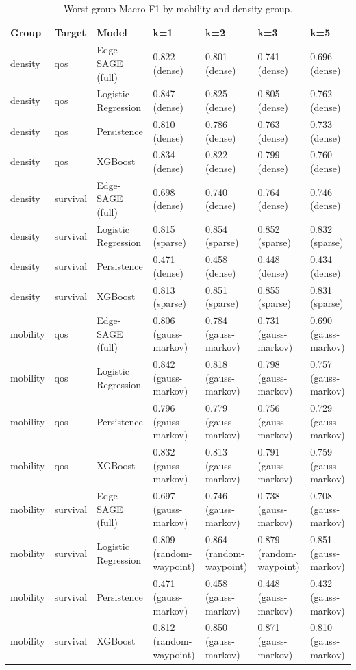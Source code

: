 \begin{table}[tb]
\caption{Worst-group Macro-F1 by mobility and density group.}
\label{tab:stage7-worst-group}
\begin{tabular}{lllllll}
\toprule
Group & Target & Model & k=1 & k=2 & k=3 & k=5 \\
\midrule
density & qos & Edge-SAGE (full) & 0.822 (dense) & 0.801 (dense) & 0.741 (dense) & 0.696 (dense) \\
density & qos & Logistic Regression & 0.847 (dense) & 0.825 (dense) & 0.805 (dense) & 0.762 (dense) \\
density & qos & Persistence & 0.810 (dense) & 0.786 (dense) & 0.763 (dense) & 0.733 (dense) \\
density & qos & XGBoost & 0.834 (dense) & 0.822 (dense) & 0.799 (dense) & 0.760 (dense) \\
density & survival & Edge-SAGE (full) & 0.698 (dense) & 0.740 (dense) & 0.764 (dense) & 0.746 (dense) \\
density & survival & Logistic Regression & 0.815 (sparse) & 0.854 (sparse) & 0.852 (sparse) & 0.832 (sparse) \\
density & survival & Persistence & 0.471 (dense) & 0.458 (dense) & 0.448 (dense) & 0.434 (dense) \\
density & survival & XGBoost & 0.813 (sparse) & 0.851 (sparse) & 0.855 (sparse) & 0.831 (sparse) \\
mobility & qos & Edge-SAGE (full) & 0.806 (gauss-markov) & 0.784 (gauss-markov) & 0.731 (gauss-markov) & 0.690 (gauss-markov) \\
mobility & qos & Logistic Regression & 0.842 (gauss-markov) & 0.818 (gauss-markov) & 0.798 (gauss-markov) & 0.757 (gauss-markov) \\
mobility & qos & Persistence & 0.796 (gauss-markov) & 0.779 (gauss-markov) & 0.756 (gauss-markov) & 0.729 (gauss-markov) \\
mobility & qos & XGBoost & 0.832 (gauss-markov) & 0.813 (gauss-markov) & 0.791 (gauss-markov) & 0.759 (gauss-markov) \\
mobility & survival & Edge-SAGE (full) & 0.697 (gauss-markov) & 0.746 (gauss-markov) & 0.738 (gauss-markov) & 0.708 (gauss-markov) \\
mobility & survival & Logistic Regression & 0.809 (random-waypoint) & 0.864 (random-waypoint) & 0.879 (random-waypoint) & 0.851 (gauss-markov) \\
mobility & survival & Persistence & 0.471 (gauss-markov) & 0.458 (gauss-markov) & 0.448 (gauss-markov) & 0.432 (gauss-markov) \\
mobility & survival & XGBoost & 0.812 (random-waypoint) & 0.850 (gauss-markov) & 0.871 (gauss-markov) & 0.810 (gauss-markov) \\
\bottomrule
\end{tabular}
\end{table}
